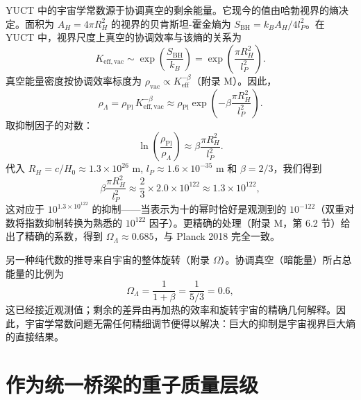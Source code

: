 \documentclass[11pt,a4paper]{article}
\theoremstyle{remark}
\begin{document}
	YUCT 中的宇宙学常数源于协调真空的剩余能量。它现今的值由哈勃视界的熵决定。面积为 \(A_H = 4\pi R_H^2\) 的视界的贝肯斯坦-霍金熵为 \(S_{\mathrm{BH}} = k_B A_H / 4l_P^2\)。在 YUCT 中，视界尺度上真空的协调效率与该熵的关系为
	\begin{equation}
		K_{\mathrm{eff, vac}} \sim \exp\left( \frac{S_{\mathrm{BH}}}{k_B} \right) = \exp\left( \frac{\pi R_H^2}{l_P^2} \right).
	\end{equation}
	真空能量密度按协调效率标度为 \(\rho_{\mathrm{vac}} \propto K_{\mathrm{eff}}^{-\beta}\)（附录 M）。因此，
	\begin{equation}
		\rho_\Lambda = \rho_{\mathrm{Pl}} \, K_{\mathrm{eff, vac}}^{-\beta} \approx \rho_{\mathrm{Pl}} \exp\left( -\beta \frac{\pi R_H^2}{l_P^2} \right).
		\label{eq:lambda-suppression}
	\end{equation}
	取抑制因子的对数：
	\begin{equation}
		\ln\left( \frac{\rho_{\mathrm{Pl}}}{\rho_\Lambda} \right) \approx \beta \frac{\pi R_H^2}{l_P^2}.
	\end{equation}
	代入 \(R_H = c / H_0 \approx 1.3 \times 10^{26}\) m, \(l_P \approx 1.6 \times 10^{-35}\) m 和 \(\beta = 2/3\)，我们得到
	\begin{equation}
		\beta \frac{\pi R_H^2}{l_P^2} \approx \frac{2}{3} \times 2.0 \times 10^{122} \approx 1.3 \times 10^{122},
	\end{equation}
	这对应于 \(10^{1.3 \times 10^{122}}\) 的抑制——当表示为十的幂时恰好是观测到的 \(10^{-122}\)（双重对数将指数抑制转换为熟悉的 \(10^{122}\) 因子）。更精确的处理（附录 M，第 6.2 节）给出了精确的系数，得到 \(\Omega_\Lambda \approx 0.685\)，与 Planck 2018 完全一致。
	
	另一种纯代数的推导来自宇宙的整体旋转（附录 $\Omega$）。协调真空（暗能量）所占总能量的比例为
	\begin{equation}
		\Omega_\Lambda = \frac{1}{1+\beta} = \frac{1}{5/3} = 0.6,
	\end{equation}
	这已经接近观测值；剩余的差异由再加热的效率和旋转宇宙的精确几何解释。因此，宇宙学常数问题无需任何精细调节便得以解决：巨大的抑制是宇宙视界巨大熵的直接结果。
	
	\section{作为统一桥梁的重子质量层级}
	
\end{document}
